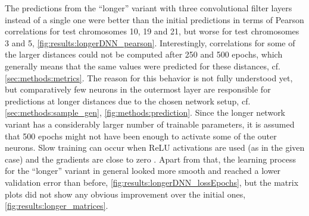 The predictions from the ``longer'' variant with three convolutional filter layers instead of a single one were better than the initial predictions in terms of
Pearson correlations for test chromosomes 10, 19 and 21, but worse for test chromosomes 3 and 5, \cref{fig:results:longerDNN_pearson}.
Interestingly, correlations for some of the larger distances could not be computed after 250 and 500 epochs, 
which generally means that the same values were predicted for these distances, cf. \cref{sec:methods:metrics}.
The reason for this behavior is not fully understood yet, but comparatively few neurons in the outermost layer are responsible for predictions at 
longer distances due to the chosen network setup, cf. \cref{sec:methods:sample_gen}, \cref{fig:methods:prediction}.
Since the longer network variant has a considerably larger number of trainable parameters,
it is assumed that 500 epochs might not have been enough to activate some of the outer neurons.
Slow training can occur when ReLU activations are used (as in the given case) and the gradients are close to zero \cite{Maas2013}.
Apart from that, the learning process for the ``longer'' variant in general looked more smooth and reached a lower validation error than before, \cref{fig:results:longerDNN_lossEpochs},
but the matrix plots did not show any obvious improvement over the initial ones, \cref{fig:results:longer_matrices}.
